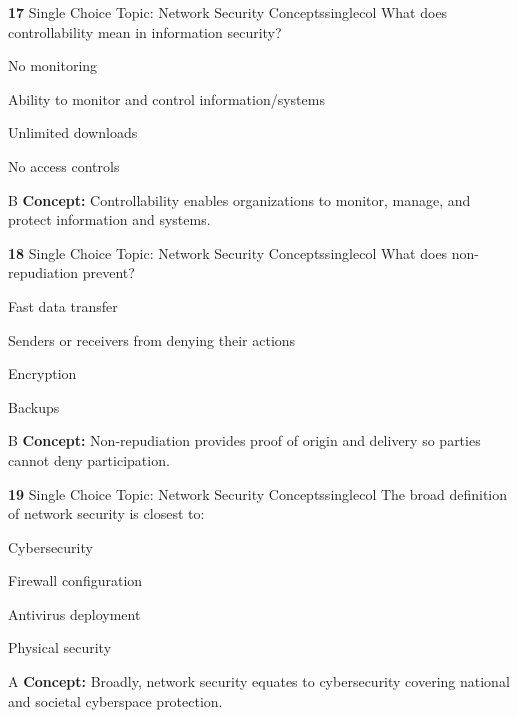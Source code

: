 \documentclass[10pt,a4paper]{article}
\begin{document}
\begin{qcard}{\color{white}\textbf{17} \hfill \small Single Choice \textbar{} Topic: Network Security Concepts}{singlecol}
What does controllability mean in information security?

\begin{qoptions}
\item No monitoring
\item Ability to monitor and control information/systems
\item Unlimited downloads
\item No access controls
\end{qoptions}
\begin{explainbox}{B}
\textbf{Concept:} Controllability enables organizations to monitor, manage, and protect information and systems.
\end{explainbox}
\end{qcard}

\begin{qcard}{\color{white}\textbf{18} \hfill \small Single Choice \textbar{} Topic: Network Security Concepts}{singlecol}
What does non-repudiation prevent?

\begin{qoptions}
\item Fast data transfer
\item Senders or receivers from denying their actions
\item Encryption
\item Backups
\end{qoptions}
\begin{explainbox}{B}
\textbf{Concept:} Non-repudiation provides proof of origin and delivery so parties cannot deny participation.
\end{explainbox}
\end{qcard}

\begin{qcard}{\color{white}\textbf{19} \hfill \small Single Choice \textbar{} Topic: Network Security Concepts}{singlecol}
The broad definition of network security is closest to:

\begin{qoptions}
\item Cybersecurity
\item Firewall configuration
\item Antivirus deployment
\item Physical security
\end{qoptions}
\begin{explainbox}{A}
\textbf{Concept:} Broadly, network security equates to cybersecurity covering national and societal cyberspace protection.
\end{explainbox}
\end{qcard}
\end{document}
